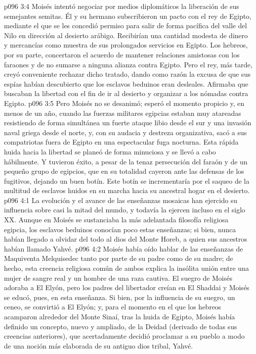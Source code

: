 \vs p096 3:4 Moisés intentó negociar por medios diplomáticos la liberación de sus semejantes semitas. Él y su hermano subscribieron un pacto con el rey de Egipto, mediante el que se les concedió permiso para salir de forma pacífica del valle del Nilo en dirección al desierto arábigo. Recibirían una cantidad modesta de dinero y mercancías como muestra de sus prolongados servicios en Egipto. Los hebreos, por su parte, concertaron el acuerdo de mantener relaciones amistosas con los faraones y de no sumarse a ninguna alianza contra Egipto. Pero el rey, más tarde, creyó conveniente rechazar dicho tratado, dando como razón la excusa de que sus espías habían descubierto que los esclavos beduinos eran desleales. Afirmaba que buscaban la libertad con el fin de ir al desierto y organizar a los nómadas contra Egipto.
\vs p096 3:5 Pero Moisés no se desanimó; esperó el momento propicio y, en menos de un año, cuando las fuerzas militares egipcias estaban muy atareadas resistiendo de forma simultánea un fuerte ataque libio desde el sur y una invasión naval griega desde el norte, y, con su audacia y destreza organizativa, sacó a sus compatriotas fuera de Egipto en una espectacular fuga nocturna. Esta rápida huida hacia la libertad se planeó de forma minuciosa y se llevó a cabo hábilmente. Y tuvieron éxito, a pesar de la tenaz persecución del faraón y de un pequeño grupo de egipcios, que en su totalidad cayeron ante las defensas de los fugitivos, dejando un buen botín. Este botín se incrementaría por el saqueo de la multitud de esclavos huidos en su marcha hacia su ancestral hogar en el desierto.
\vs p096 4:1 La evolución y el avance de las enseñanzas mosaicas han ejercido su influencia sobre casi la mitad del mundo, y todavía la ejercen incluso en el siglo XX. Aunque en Moisés se sustanciaba la más adelantada filosofía religiosa egipcia, los esclavos beduinos conocían poco estas enseñanzas; si bien, nunca habían llegado a olvidar del todo al dios del Monte Horeb, a quien sus ancestros habían llamado Yahvé.
\vs p096 4:2 Moisés había oído hablar de las enseñanzas de Maquiventa Melquisedec tanto por parte de su padre como de su madre; de hecho, esta creencia religiosa común de ambos explica la insólita unión entre una mujer de sangre real y un hombre de una raza cautiva. El suegro de Moisés adoraba a El Elyón, pero los padres del libertador creían en El Shaddai y Moisés se educó, pues, en esta enseñanza. Si bien, por la influencia de su suegro, un ceneo, se convirtió a El Elyón; y, para el momento en el que los hebreos acamparon alrededor del Monte Sinaí, tras la huida de Egipto, Moisés había definido un concepto, nuevo y ampliado, de la Deidad (derivado de todas sus creencias anteriores), que acertadamente decidió proclamar a su pueblo a modo de una noción más elaborada de su antiguo dios tribal, Yahvé.
